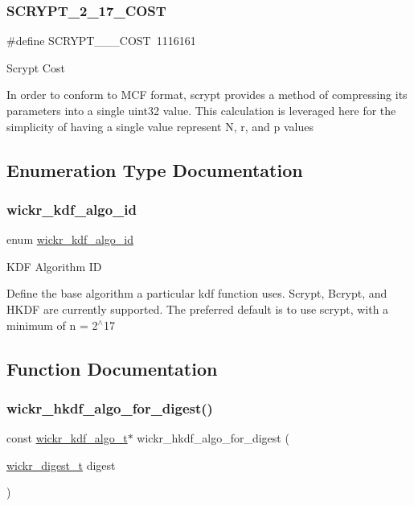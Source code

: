 \subsubsection{\texorpdfstring{SCRYPT\_2\_17\_COST}{SCRYPT\_2\_17\_COST}}
{\footnotesize\ttfamily \#define S\+C\+R\+Y\+P\+T\+\_\+\_\+\_\+\+C\+O\+ST~1116161}

Scrypt Cost

In order to conform to M\+CF format, scrypt provides a method of compressing its parameters into a single uint32 value. This calculation is leveraged here for the simplicity of having a single value represent N, r, and p values 

\subsection{Enumeration Type Documentation}
\mbox{\label{group__wickr__kdf_ga106149e3507106abb6b5be843a4e7c16}} 
\subsubsection{\texorpdfstring{wickr\_kdf\_algo\_id}{wickr\_kdf\_algo\_id}}
{\footnotesize\ttfamily enum \mbox{\hyperlink{group__wickr__kdf_ga106149e3507106abb6b5be843a4e7c16}{wickr\+\_\+kdf\+\_\+algo\+\_\+id}}}

K\+DF Algorithm ID

Define the base algorithm a particular kdf function uses. Scrypt, Bcrypt, and H\+K\+DF are currently supported. The preferred default is to use scrypt, with a minimum of n = 2$^\wedge$17 

\subsection{Function Documentation}
\mbox{\label{group__wickr__kdf_ga81c7a5adea69d04e019dd58080268a08}} 
\subsubsection{\texorpdfstring{wickr\_hkdf\_algo\_for\_digest()}{wickr\_hkdf\_algo\_for\_digest()}}
{\footnotesize\ttfamily const \mbox{\hyperlink{structwickr__kdf__algo}{wickr\+\_\+kdf\+\_\+algo\+\_\+t}}$\ast$ wickr\+\_\+hkdf\+\_\+algo\+\_\+for\+\_\+digest (\begin{DoxyParamCaption}\item[{\mbox{\hyperlink{structwickr__digest}{wickr\+\_\+digest\+\_\+t}}}]{digest }\end{DoxyParamCaption})}

